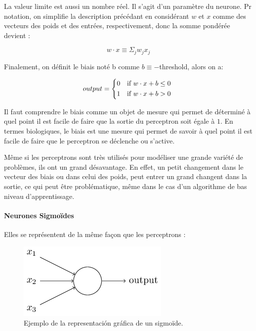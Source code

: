 \documentclass[conference,onecolumn]{IEEEtran}
\begin{document}
La valeur limite est aussi un nombre réel. Il s’agit d’un paramètre du neurone. Pr notation, on simplifie la description précédant en considérant $w$ et $x$ comme des vecteurs des poids et des entrées, respectivement, donc la somme pondérée devient : 

\begin{equation}
    w \cdot x \equiv \Sigma_j w_jx_j
\end{equation}

Finalement, on définit le biais noté b comme $b \equiv -$threshold, alors on a: 

\begin{equation}
    output =
    \begin{cases*}
      0 & if $w \cdot x + b \leq 0$ \\
      1 & if $w \cdot x + b > 0$ \\
    \end{cases*}
\end{equation}

Il faut comprendre le biais comme un objet de mesure qui permet de déterminé à quel point il est facile de faire que la sortie du perceptron soit égale à $1$. En termes biologiques, le biais est une mesure qui permet de savoir à quel point il est facile de faire que le perceptron se déclenche ou s’active. 

Même si les perceptrons sont très utilisés pour modéliser une grande variété de problèmes, ils ont un grand désavantage. En effet, un petit changement dans le vecteur des biais ou dans celui des poids, peut entrer un grand changent dans la sortie, ce qui peut être problématique, même dans le cas d’un algorithme de bas niveau d’apprentissage.
\hfill\\

\paragraph{Neurones Sigmoïdes}
Elles se représentent de la même façon que les perceptrons : 

 \begin{figure}[H]
 \centering
    \includegraphics[scale=0.5]{img9.png}
    \caption{Ejemplo de la representación gráfica de un sigmoïde.}
\end{figure}
\end{document}
